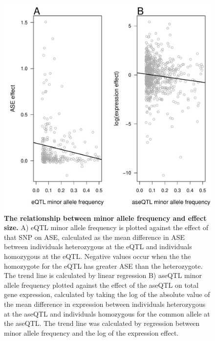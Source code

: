 \begin{figure}[ht!]
      \centering
       \includegraphics[width=\linewidth]{Ch3Fig4}
    \caption{\textbf{The relationship between minor allele frequency and effect size.} A) eQTL minor allele frequency is plotted against the effect of that SNP on ASE, calculated as the mean difference in ASE between individuals heterozygous at the eQTL and individuals homozygous at the eQTL. Negative values occur when the the homozygote for the eQTL has greater ASE than the heterozygote. The trend line is calculated by linear regression B) aseQTL minor allele frequency plotted against the effect of the aseQTL on total gene expression, calculated by taking the log of the absolute value of the mean difference in expression between individuals heterozygous at the aseQTL and individuals homozygous for the common allele at the aseQTL. The trend line was calculated by regression between minor allele frequency and the log of the expression effect.}
    \label{fig:3fig4}
\end{figure}

